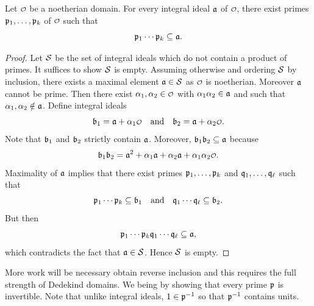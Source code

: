     \begin{lemma}\label{lem:integral_ideal_prime_inclusion}
      Let \(\smc{O}\) be a noetherian domain. For every integral ideal \(\mathfrak{a}\) of \(\smc{O}\), there exist primes \(\mathfrak{p}_{1},\ldots,\mathfrak{p}_{k}\) of \(\smc{O}\) such that
      \[
        \mathfrak{p}_{1}\cdots\mathfrak{p}_{k} \subseteq \mathfrak{a}.
      \]
    \end{lemma}
    \begin{proof}
      Let \(\mathcal{S}\) be the set of integral ideals which do not contain a product of primes. It suffices to show \(\mathcal{S}\) is empty. Assuming otherwise and ordering \(\mathcal{S}\) by inclusion, there exists a maximal element \(\mathfrak{a} \in \mathcal{S}\) as \(\smc{O}\) is noetherian. Moreover \(\mathfrak{a}\) cannot be prime. Then there exist \(\a_{1},\a_{2} \in \smc{O}\) with \(\alpha_{1}\alpha_{2} \in \mathfrak{a}\) and such that \(\alpha_{1},\alpha_{2} \notin \mathfrak{a}\). Define integral ideals
      \[
        \mf{b}_{1} = \mf{a}+\a_{1}\smc{O} \quad \text{and} \quad \mf{b}_{2} = \mf{a}+\a_{2}\smc{O}.
      \]
      Note that \(\mathfrak{b}_{1}\) and \(\mathfrak{b}_{2}\) strictly contain \(\mathfrak{a}\). Moreover, \(\mathfrak{b}_{1}\mathfrak{b}_{2} \subseteq \mathfrak{a}\) because
      \[
        \mf{b}_{1}\mf{b}_{2} = \mf{a}^{2}+\a_{1}\mf{a}+\a_{2}\mf{a}+\a_{1}\a_{2}\smc{O}.
      \]
      Maximality of \(\mathfrak{a}\) implies that there exist primes \(\mathfrak{p}_{1},\ldots,\mathfrak{p}_{k}\) and \(\mathfrak{q}_{1},\ldots,\mathfrak{q}_{\ell}\) such that
      \[
        \mathfrak{p}_{1}\cdots\mathfrak{p}_{k} \subseteq \mathfrak{b}_{1} \quad \text{and} \quad \mathfrak{q}_{1}\cdots\mathfrak{q}_{\ell} \subseteq \mathfrak{b}_{2}.
      \]
      But then
      \[
        \mathfrak{p}_{1}\cdots\mathfrak{p}_{k}\mathfrak{q}_{1}\cdots\mathfrak{q}_{\ell} \subseteq \mathfrak{a},
      \]
      which contradicts the fact that \(\mathfrak{a} \in \mathcal{S}\). Hence \(\mathcal{S}\) is empty.
    \end{proof}

    More work will be necessary obtain reverse inclusion and this requires the full strength of Dedekind domains. We being by showing that every prime \(\mathfrak{p}\) is invertible. Note that unlike integral ideals, \(1 \in \mathfrak{p}^{-1}\) so that \(\mathfrak{p}^{-1}\) contains units.

